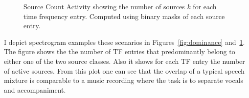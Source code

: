 \begin{figure}[H]
    \centering
    \tiny
    \hfill
    \hfill
    \hfill
    \caption{Source Count Activity showing the number of sources $k$ for each time frequency entry. Computed using binary masks of each source entry.}
    \label{fig:count}
\end{figure}

I depict spectrogram examples these scenarios in Figures~\ref{fig:dominance} and~\ref{fig:count}.
The figure shows the the number of TF entries that predominantly belong to either one of the two source classes.
Also it shows for each TF entry the number of active sources.
From this plot one can see that the overlap of a typical speech mixture is comparable to a music recording where the task is to separate vocals and accompaniment.\\

